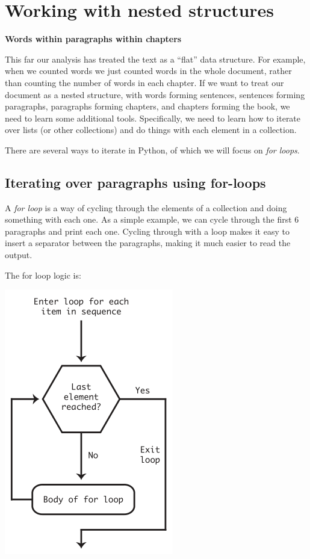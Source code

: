 \documentclass[]{book}
\begin{document}
\hypertarget{working-with-nested-structures}{%
\section{Working with nested structures}\label{working-with-nested-structures}}

\textbf{Words within paragraphs within chapters}

This far our analysis has treated the text as a ``flat'' data structure. For example, when we counted words we just counted words in the whole document, rather than counting the number of words in each chapter. If we want to treat our document as a nested structure, with words forming sentences, sentences forming paragraphs, paragraphs forming chapters, and chapters forming the book, we need to learn some additional tools. Specifically, we need to learn how to iterate over lists (or other collections) and do things with each element in a collection.

There are several ways to iterate in Python, of which we will focus on \emph{for loops}.

\hypertarget{iterating-over-paragraphs-using-for-loops}{%
\subsection{Iterating over paragraphs using for-loops}\label{iterating-over-paragraphs-using-for-loops}}

A \emph{for loop} is a way of cycling through the elements of a collection and doing something with each one. As a simple example, we can cycle through the first 6 paragraphs and print each one. Cycling through with a loop makes it easy to insert a separator between the paragraphs, making it much easier to read the output.

The for loop logic is:

\includegraphics{Python/PythonIntro/images/for_loop_pic_small.png}
\end{document}

